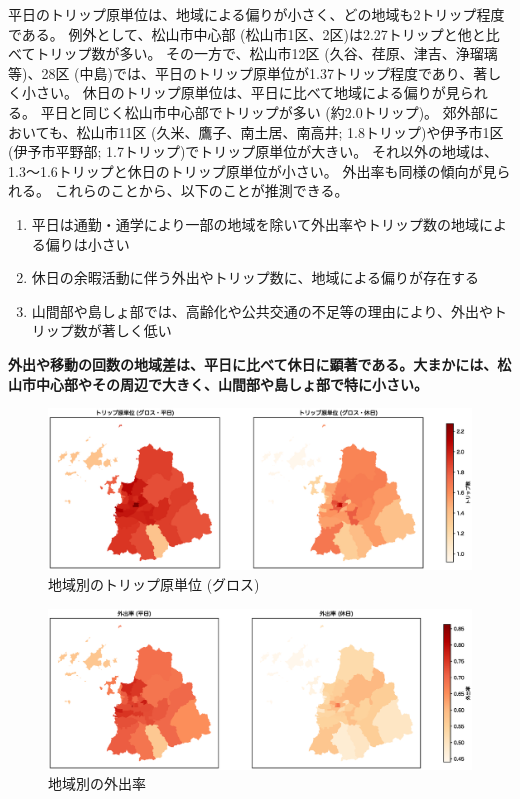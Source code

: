 \documentclass[a4paper,12pt, uplatex]{jsbook}
\begin{document}
平日のトリップ原単位は、地域による偏りが小さく、どの地域も2トリップ程度である。
例外として、松山市中心部 (松山市1区、2区)は2.27トリップと他と比べてトリップ数が多い。
その一方で、松山市12区 (久谷、荏原、津吉、浄瑠璃等)、28区 (中島)では、平日のトリップ原単位が1.37トリップ程度であり、著しく小さい。
休日のトリップ原単位は、平日に比べて地域による偏りが見られる。
平日と同じく松山市中心部でトリップが多い (約2.0トリップ)。
郊外部においても、松山市11区 (久米、鷹子、南土居、南高井; 1.8トリップ)や伊予市1区 (伊予市平野部; 1.7トリップ)でトリップ原単位が大きい。
それ以外の地域は、1.3〜1.6トリップと休日のトリップ原単位が小さい。
外出率も同様の傾向が見られる。
これらのことから、以下のことが推測できる。
\begin{enumerate}
  \item 平日は通勤・通学により一部の地域を除いて外出率やトリップ数の地域による偏りは小さい
  \item 休日の余暇活動に伴う外出やトリップ数に、地域による偏りが存在する
  \item 山間部や島しょ部では、高齢化や公共交通の不足等の理由により、外出やトリップ数が著しく低い
\end{enumerate}

\color{red}
\begin{framed}
\noindent
\textbf{\large 外出や移動の回数の地域差は、平日に比べて休日に顕著である。大まかには、松山市中心部やその周辺で大きく、山間部や島しょ部で特に小さい。}
\end{framed}
\color{black}

\clearpage
\begin{figure}[htbp]
    \centering
    \includegraphics[width=1.0\textwidth]{picture/トリップ数_全体.eps}
    \caption{地域別のトリップ原単位 (グロス)}
    \label{fig:generation_all}
\end{figure}

\begin{figure}[htbp]
    \centering
    \includegraphics[width=1.0\textwidth]{picture/外出率_全体.eps}
    \caption{地域別の外出率}
    \label{fig:out_all}
\end{figure}
\end{document}
